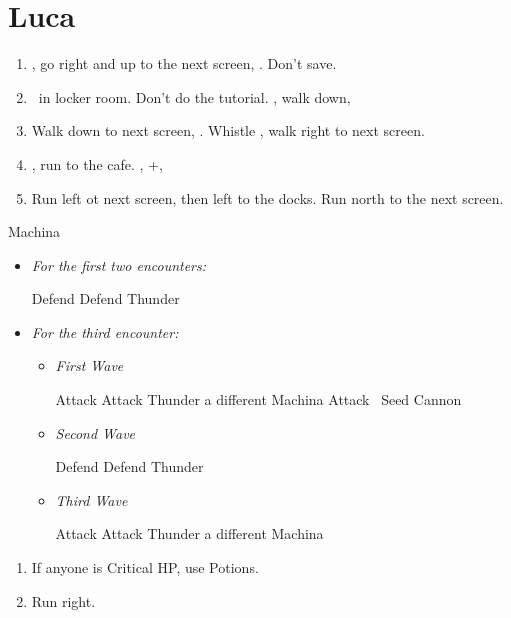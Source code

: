 \chapter{Luca}

\begin{enumerate}
	\item \sd, go right and up to the next screen, \cs[2:30]. Don't save.
	\item \sd\ in locker room. Don't do the tutorial. \sd, walk down, \sd
	\item Walk down to next screen, \sd. Whistle \cs[0:30], walk right to next screen.
	\item \sd, run to the cafe. \sd, \skippablefmv+\cs[1:20], \sd
	\item Run left ot next screen, then left to the docks. Run north to the next screen.
\end{enumerate}
\begin{battle}{Machina}
	\begin{itemize}
	\item \textit{For the first two encounters:}
	\begin{itemize}
		\tidusf Defend
		\kimahrif Defend
		\luluf Thunder
	\end{itemize}
	\item \textit{For the third encounter:}
	\begin{itemize}
		\item \textit{First Wave}
		\begin{itemize}
			\tidusf Attack
			\kimahrif Attack
			\luluf Thunder a different Machina
			\tidusf Attack
			\kimahrif \od\ Seed Cannon
		\end{itemize}
		\item \textit{Second Wave}
		\begin{itemize}
			\tidusf Defend
			\kimahrif Defend
			\luluf Thunder
		\end{itemize}
		\item \textit{Third Wave}
		\begin{itemize}
			\tidusf Attack
			\kimahrif Attack
			\luluf Thunder a different Machina
		\end{itemize}
	\end{itemize}
	\end{itemize}
\end{battle}
\begin{enumerate}[resume]
	\item If anyone is Critical HP, use Potions.
	\item Run right.
\end{enumerate}
